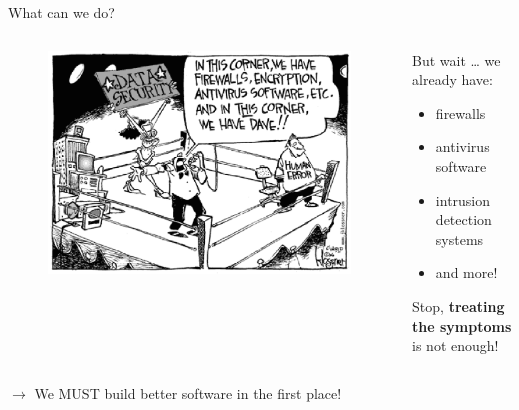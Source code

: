 \documentclass[aspectratio=169]{beamer}
\begin{document}
  \begin{frame}{What can we do?}
    \vspace{-1.4em}
    \begin{columns}[b]
      \begin{column}{0.5\textwidth}
        \begin{figure}
          \centering
          \includegraphics[scale=0.38]{figures/dave}
        \end{figure}
      \end{column}
      \begin{column}{0.5\textwidth}
        But wait \ldots{} we already have:
        \begin{itemize}
        \item firewalls
        \item antivirus software
        \item intrusion detection systems
        \item and more!
        \end{itemize}
        \pause
        Stop, \textbf{treating the symptoms} is not enough!
      \end{column}
    \end{columns}
    \centering
    \vfill
    \pause
    {\LARGE $\to$ We MUST build \alert{better software} in the first place!}
  \end{frame}
\end{document}
